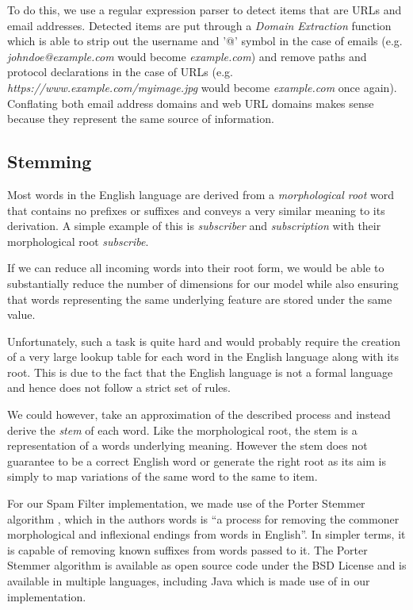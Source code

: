 To do this, we use a regular expression parser to detect items that are URLs and email addresses. Detected items are put through a \emph{Domain Extraction} function which is able to strip out the username and '@' symbol in the case of emails (e.g. \emph{johndoe@example.com} would become \emph{example.com}) and remove paths and protocol declarations in the case of URLs (e.g. \emph{https://www.example.com/myimage.jpg} would become \emph{example.com} once again). Conflating both email address domains and web URL domains makes sense because they represent the same source of information.


\subsection{Stemming}
Most words in the English language are derived from a \emph{morphological root} word that contains no prefixes or suffixes and conveys a very similar meaning to its derivation. A simple example of this is \emph{subscriber} and \emph{subscription} with their morphological root \emph{subscribe}. 

If we can reduce all incoming words into their root form, we would be able to substantially reduce the number of dimensions for our model while also ensuring that words representing the same underlying feature are stored under the same value.

Unfortunately, such a task is quite hard and would probably require the creation of a very large lookup table for each word in the English language along with its root. This is due to the fact that the English language is not a formal language and hence does not follow a strict set of rules. 

We could however, take an approximation of the described process and instead derive the \emph{stem} of each word. Like the morphological root, the stem is a representation of a words underlying meaning. However the stem does not guarantee to be a correct English word or generate the right root as its aim is simply to map variations of the same word to the same to item. 

For our Spam Filter implementation, we made use of the Porter Stemmer algorithm \cite{porter1980}, which in the authors words is ``a process for removing the commoner morphological and inflexional endings from words in English''. In simpler terms, it is capable of removing known suffixes from words passed to it. The Porter Stemmer algorithm is available as open source code under the BSD License and is available in multiple languages, including Java which is made use of in our implementation.

